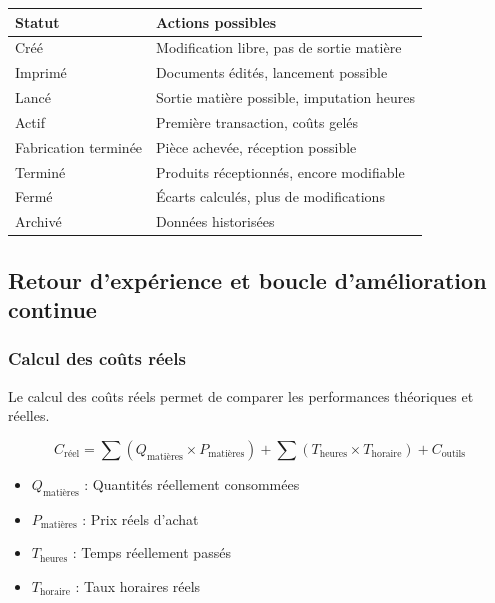 \documentclass{article}
\begin{document}
\begin{table}[h]
\begin{table}[h]
\centering
\begin{tabular}{|l|l|}
\hline
\textbf{Statut} & \textbf{Actions possibles} \\
\hline
Créé & Modification libre, pas de sortie matière \\
Imprimé & Documents édités, lancement possible \\
Lancé & Sortie matière possible, imputation heures \\
Actif & Première transaction, coûts gelés \\
Fabrication terminée & Pièce achevée, réception possible \\
Terminé & Produits réceptionnés, encore modifiable \\
Fermé & Écarts calculés, plus de modifications \\
Archivé & Données historisées \\
\hline
\end{tabular}
\end{table}

\subsection{Retour d'expérience et boucle d'amélioration continue}

\subsubsection{Calcul des coûts réels}

Le calcul des coûts réels permet de comparer les performances théoriques et réelles.

\begin{tcolorbox}[colback=blueclair, colframe=blue!70!black, title=Composantes des coûts réels]
\[
C_{\text{réel}} = \sum (Q_{\text{matières}} \times P_{\text{matières}}) + \sum (T_{\text{heures}} \times T_{\text{horaire}}) + C_{\text{outils}}
\]
\begin{itemize}
    \item $Q_{\text{matières}}$ : Quantités réellement consommées
    \item $P_{\text{matières}}$ : Prix réels d'achat
    \item $T_{\text{heures}}$ : Temps réellement passés
    \item $T_{\text{horaire}}$ : Taux horaires réels
\end{itemize}
\end{tcolorbox}


\end{table}
\end{document}
